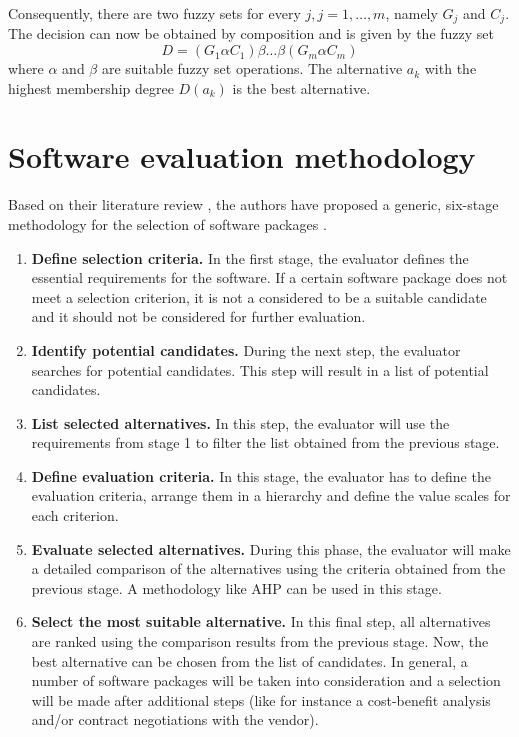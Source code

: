 Consequently, there are two fuzzy sets for every $j, j = 1, \ldots, m$, namely $G_j$ and $C_j$. The decision can now be obtained by composition and is given by the fuzzy set 
\begin{equation}
    D = (G_1 \alpha C_1) \beta \ldots \beta (G_m \alpha C_m)
\end{equation}
where $\alpha$ and $\beta$ are suitable fuzzy set operations. The alternative $a_k$ with the highest membership degree $D(a_k)$ is the best alternative.





\section{Software evaluation methodology}
\label{sec:selection_method}

Based on their literature review \cite{Jadhav:2009}, the authors have proposed a generic, six-stage methodology for the selection of software packages \cite{Jadhav:2011}.

\begin{enumerate}
    \item \textbf{Define selection criteria.} In the first stage, the evaluator defines the essential requirements for the software. If a certain software package does not meet a selection criterion, it is not a considered to be a suitable candidate and it should not be considered for further evaluation. 
    \item \textbf{Identify potential candidates.} During the next step, the evaluator searches for potential candidates. This step will result in a list of potential candidates.
    \item \textbf{List selected alternatives.} In this step, the evaluator will use the requirements from stage 1 to filter the list obtained from the previous stage. 
    \item \textbf{Define evaluation criteria.} In this stage, the evaluator has to define the evaluation criteria, arrange them in a hierarchy and define the value scales for each criterion. 
    \item \textbf{Evaluate selected alternatives.} During this phase, the evaluator will make a detailed comparison of the alternatives using the criteria obtained from the previous stage. A methodology like AHP can be used in this stage.
    \item \textbf{Select the most suitable alternative.} In this final step, all alternatives are ranked using the comparison results from the previous stage. Now, the best alternative can be chosen from the list of candidates. In general, a number of software packages will be taken into consideration and a selection will be made after additional steps (like for instance a cost-benefit analysis and/or contract negotiations with the vendor). 
\end{enumerate}

